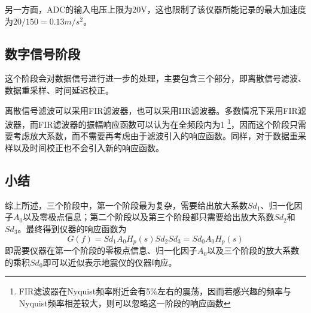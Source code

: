 另一方面，ADC的输入电压上限为20V，这也限制了该仪器所能记录的最大加速度为$20/150=0.13 m/s^2$。

\subsection{数字信号阶段}
这个阶段会对数据信号进行进一步的处理，主要包含三个部分，即离散信号滤波、数据重采样、时间延迟校正。

离散信号滤波可以采用FIR滤波器，也可以采用IIR滤波器。多数情况下采用FIR滤波器，而FIR滤波器的振幅响应函数可以认为在全频段内为1
\footnote{FIR滤波器在Nyquist频率附近会有5\%左右的震荡，因而若感兴趣的频率与Nyquist频率相差较大，则可以忽略这一阶段的响应函数}，因而这个阶段只需要考虑放大系数，而不需要再考虑由于滤波引入的响应函数。同样，对于数据重采样以及时间校正也不会引入新的响应函数。

\subsection{小结}
综上所述，三个阶段中，第一个阶段最为复杂，需要给出放大系数$Sd_{1}$、归一化因子$A_0$以及零极点信息；第二个阶段以及第三个阶段都只需要给出放大系数$Sd_{2}$和$Sd_3$。最终得到仪器的响应函数为
\[
    G(f)=Sd_1 A_0 H_p(s) Sd_2 Sd_3=Sd_0 A_0 H_p(s)
\]
即需要仪器在第一个阶段的零极点信息、归一化因子$A_0$以及三个阶段的放大系数的乘积$Sd_0$即可以近似表示地震仪的仪器响应。
